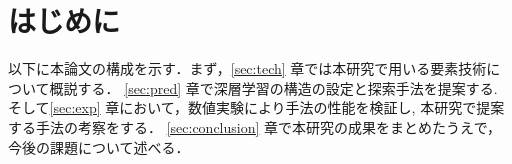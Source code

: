 \newpage
\changeindent{0cm}
\section{はじめに}
\label{sec:intro}
\changeindent{2cm}


以下に本論文の構成を示す．まず，\ref{sec:tech} 章では本研究で用いる要素技術について概説する．
\ref{sec:pred} 章で深層学習の構造の設定と探索手法を提案する.
そして\ref{sec:exp} 章において，数値実験により手法の性能を検証し, 本研究で提案する手法の考察をする．
\ref{sec:conclusion} 章で本研究の成果をまとめたうえで，今後の課題について述べる．


\begin{comment}
\end{comment}
